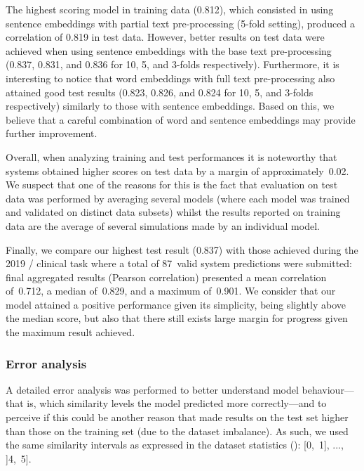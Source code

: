 The highest scoring model in training data (0.812), which consisted in using sentence embeddings with partial text pre-processing (5-fold setting), produced a correlation of 0.819 in test data.
However, better results on test data were achieved when using sentence embeddings with the base text pre-processing (0.837, 0.831, and 0.836 for 10, 5, and 3-folds respectively).
Furthermore, it is interesting to notice that word embeddings with full text pre-processing also attained good test results (0.823, 0.826, and 0.824 for 10, 5, and 3-folds respectively) similarly to those with sentence embeddings.
Based on this, we believe that a careful combination of word and sentence embeddings may provide further improvement.

Overall, when analyzing training and test performances it is noteworthy that systems obtained higher scores on test data by a margin of approximately~0.02.
We suspect that one of the reasons for this is the fact that evaluation on test data was performed by averaging several models (where each model was trained and validated on distinct data subsets) whilst the results reported on training data are the average of several simulations made by an individual model.

Finally, we compare our highest test result (0.837) with those achieved during the 2019 / clinical  task \parencite{wang2020d} where a total of 87~valid system predictions were submitted: final aggregated results (Pearson correlation) presented a mean correlation of~0.712, a median of~0.829, and a maximum of~0.901.
We consider that our model attained a positive performance given its simplicity, being slightly above the median score, but also that there still exists large margin for progress given the maximum result achieved.


\subsubsection{Error analysis}



A detailed error analysis was performed to better understand model behaviour---that is, which similarity levels the model predicted more correctly---and to perceive if this could be another reason that made results on the test set higher than those on the training set (due to the dataset imbalance).
As such, we used the same similarity intervals as expressed in the dataset statistics (): [0,~1], ..., ]4,~5].

